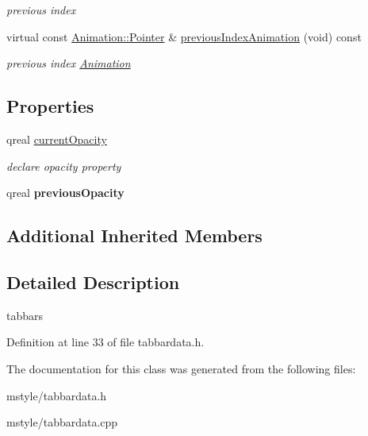 \begin{Indent}
\begin{DoxyCompactItemize}
\begin{DoxyCompactList}\small\item\em previous index \end{DoxyCompactList}\item 
\mbox{\label{class_tab_bar_data_adbf2cc9bc92f6da224bb1b21ce99ef61}} 
virtual const \hyperlink{class_animation_ac48a8d074abd43dc3f6485353ba24e30}{Animation\+::\+Pointer} \& \hyperlink{class_tab_bar_data_adbf2cc9bc92f6da224bb1b21ce99ef61}{previous\+Index\+Animation} (void) const
\begin{DoxyCompactList}\small\item\em previous index \hyperlink{class_animation}{Animation} \end{DoxyCompactList}\end{DoxyCompactItemize}
\end{Indent}
\subsection*{Properties}
\begin{DoxyCompactItemize}
\item 
\mbox{\label{class_tab_bar_data_a5ead4fd7a837dda0720c6f346972bbfe}} 
qreal \hyperlink{class_tab_bar_data_a5ead4fd7a837dda0720c6f346972bbfe}{current\+Opacity}
\begin{DoxyCompactList}\small\item\em declare opacity property \end{DoxyCompactList}\item 
\mbox{\label{class_tab_bar_data_a3f1acf7f3affd48478f6138bb2bdad0d}} 
qreal {\bfseries previous\+Opacity}
\end{DoxyCompactItemize}
\subsection*{Additional Inherited Members}


\subsection{Detailed Description}
tabbars 

Definition at line 33 of file tabbardata.\+h.



The documentation for this class was generated from the following files\+:\begin{DoxyCompactItemize}
\item 
mstyle/tabbardata.\+h\item 
mstyle/tabbardata.\+cpp\end{DoxyCompactItemize}
